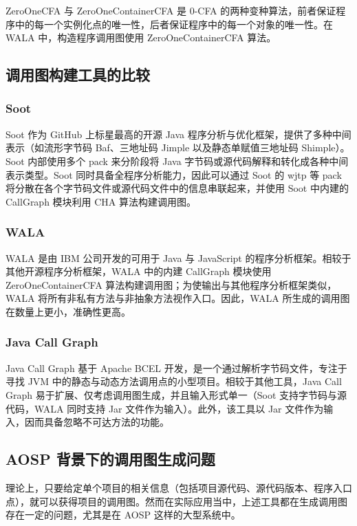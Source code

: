 ZeroOneCFA 与 ZeroOneContainerCFA 是 0-CFA 的两种变种算法，前者保证程序中的每一个实例化点的唯一性，后者保证程序中的每一个对象的唯一性。在 WALA 中，构造程序调用图使用 ZeroOneContainerCFA 算法\cite{AHybridSoftwareChangeImpactAnalysis}。

\subsection{调用图构建工具的比较}

\subsubsection{Soot}

Soot 作为 GitHub 上标星最高的开源 Java 程序分析与优化框架，提供了多种中间表示（如流形字节码 Baf、三地址码 Jimple 以及静态单赋值三地址码 Shimple）。Soot 内部使用多个 pack 来分阶段将 Java 字节码或源代码解释和转化成各种中间表示类型。Soot 同时具备全程序分析能力，因此可以通过 Soot 的 wjtp 等 pack 将分散在各个字节码文件或源代码文件中的信息串联起来，并使用 Soot 中内建的 CallGraph 模块利用 CHA 算法构建调用图。

\subsubsection{WALA}

WALA 是由 IBM 公司开发的可用于 Java 与 JavaScript 的程序分析框架。相较于其他开源程序分析框架，WALA 中的内建 CallGraph 模块使用 ZeroOneContainerCFA 算法构建调用图；为使输出与其他程序分析框架类似，WALA 将所有非私有方法与非抽象方法视作入口。因此，WALA 所生成的调用图在数量上更小，准确性更高。

\subsubsection{Java Call Graph}

Java Call Graph 基于 Apache BCEL 开发，是一个通过解析字节码文件，专注于寻找 JVM 中的静态与动态方法调用点的小型项目。相较于其他工具，Java Call Graph 易于扩展、仅考虑调用图生成，并且输入形式单一（Soot 支持字节码与源代码，WALA 同时支持 Jar 文件作为输入）。此外，该工具以 Jar 文件作为输入，因而具备忽略不可达方法的功能。

\subsection{AOSP 背景下的调用图生成问题}

理论上，只要给定单个项目的相关信息（包括项目源代码、源代码版本、程序入口点），就可以获得项目的调用图。然而在实际应用当中，上述工具都在生成调用图存在一定的问题，尤其是在 AOSP 这样的大型系统中。

